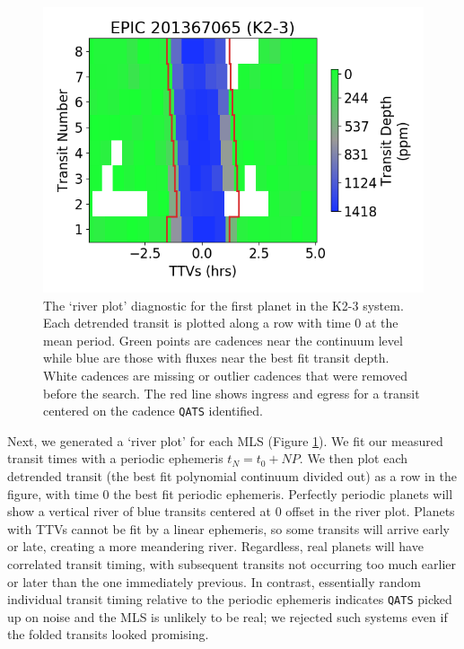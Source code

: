 \documentclass[twocolumn]{aastex62}
\newcommand{\pipeline}[1]{\texttt{#1}}
\begin{document}
\begin{figure}[tbp]
\includegraphics[width=\columnwidth]{riverplot.png}
\caption{The `river plot' diagnostic for the first planet in the K2-3
  system. Each detrended transit is plotted along a row with time 0 at
  the mean period. Green points are cadences near the continuum level
  while blue are those with fluxes near the best fit transit depth.
  White cadences are missing or outlier cadences that were removed
  before the search. The red line shows ingress and egress for a
  transit centered on the cadence \pipeline{QATS}
  identified. \label{river}}
\end{figure}

Next, we generated a `river plot' for each MLS (Figure
\ref{river}). We fit our measured transit times with a periodic
ephemeris $t_N = t_0 + N P$. We then plot each detrended transit (the
best fit polynomial continuum divided out) as a row in the figure,
with time 0 the best fit periodic ephemeris.  Perfectly periodic
planets will show a vertical river of blue transits centered at 0
offset in the river plot. Planets with TTVs cannot be fit by a linear
ephemeris, so some transits will arrive early or late, creating a more
meandering river. Regardless, real planets will have correlated
transit timing, with subsequent transits not occurring too much
earlier or later than the one immediately previous. In contrast,
essentially random individual transit timing relative to the periodic
ephemeris indicates \pipeline{QATS} picked up on noise and the MLS is
unlikely to be real; we rejected such systems even if the folded
transits looked promising.
\end{document}
